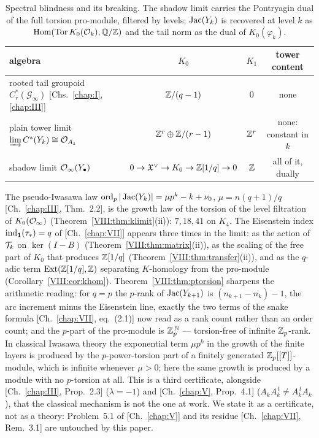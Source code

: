 \begin{table}[ht]
\centering\small
\renewcommand{\arraystretch}{1.25}
\begin{tabular}{lccc}
\toprule
algebra & $K_0$ & $K_1$ & tower content\\
\midrule
rooted tail groupoid $C^*_r(\mathcal G_\infty)$ [Chs.~\ref{chap:I}, \ref{chap:III}] & $\mathbb{Z}/(q-1)$ & $0$ & none\\
plain tower limit $\varinjlim C^*(Y_k)\cong\mathcal{O}_{A_1}$ & $\mathbb{Z}^{r}\oplus\mathbb{Z}/(r-1)$ & $\mathbb{Z}^{r}$ & none: constant in $k$\\
shadow limit $\mathcal{O}_\infty(Y_\bullet)$ & $0\to\mathfrak{X}^{\vee}\to K_0\to\mathbb{Z}[1/q]\to0$ & $\mathbb{Z}$ & all of it, dually\\
\bottomrule
\end{tabular}
\medskip
\caption{Spectral blindness and its breaking. The shadow limit carries the Pontryagin
dual of the full torsion pro-module, filtered by levels; $\operatorname{Jac}(Y_k)$ is recovered at
level $k$ as $\operatorname{Hom}(\operatorname{Tor} K_0(\mathcal{O}_k),\mathbb{Q}/\mathbb{Z})$ and the tail norm as the dual of
$K_0(\varphi_k)$.}
\label{VIII:tab:compare}
\end{table}

\begin{remark}\label{VIII:rem:euler}
The pseudo-Iwasawa law $\operatorname{ord}_p|\operatorname{Jac}(Y_k)|=\mu p^k-k+\nu_0$, $\mu=n(q{+}1)/q$
[Ch.~\ref{chap:III}, Thm.~2.2], is the growth law of the torsion of the level filtration of
$K_0(\mathcal{O}_\infty)$ (Theorem~\ref{VIII:thm:klimit}(ii)): $7,18,41$ on $K_4$. The Eisenstein index
$\operatorname{ind}_{\mathbf1}(\tau_*)=q$ of [Ch.~\ref{chap:VII}] appears three times in the limit: as the action of $\mathcal{T}_{k}$ on
$\ker(I-B)$ (Theorem~\ref{VIII:thm:matrix}(ii)), as the scaling of the free part of $K_0$ that
produces $\mathbb{Z}[1/q]$ (Theorem~\ref{VIII:thm:transfer}(ii)), and as the $q$-adic term
$\operatorname{Ext}(\mathbb{Z}[1/q],\mathbb{Z})$ separating $K$-homology from the pro-module (Corollary~\ref{VIII:cor:khom}).
Theorem~\ref{VIII:thm:ptorsion} sharpens the arithmetic reading: for $q=p$ the $p$-rank of
$\operatorname{Jac}(Y_{k+1})$ is $(n_{k+1}-n_k)-1$, the arc increment minus the Eisenstein line, exactly
the two terms of the snake formula [Ch.~\ref{chap:VII}, eq.~(2.1)] now read as a rank count rather than
an order count; and the $p$-part of the pro-module is $\mathbb{Z}_p^{\,\mathbb N}$ --- torsion-free
of infinite $\mathbb{Z}_p$-rank. In classical Iwasawa theory the exponential term $\mu p^k$ in the
growth of the finite layers is produced by the $p$-power-torsion part of a finitely
generated $\mathbb{Z}_p[[T]]$-module, which is infinite whenever $\mu>0$; here the same growth is
produced by a module with no $p$-torsion at all. This is a third certificate, alongside
[Ch.~\ref{chap:III}, Prop.~2.3] ($\lambda=-1$) and [Ch.~\ref{chap:V}, Prop.~4.1] ($A_kA_k^{\,t}\ne A_k^{\,t}A_k$), that
the classical mechanism is not the one at work. We state it as a certificate, not as a
theory: Problem~5.1 of [Ch.~\ref{chap:V}] and its residue [Ch.~\ref{chap:VII}, Rem.~3.1] are untouched by this paper.
\end{remark}

